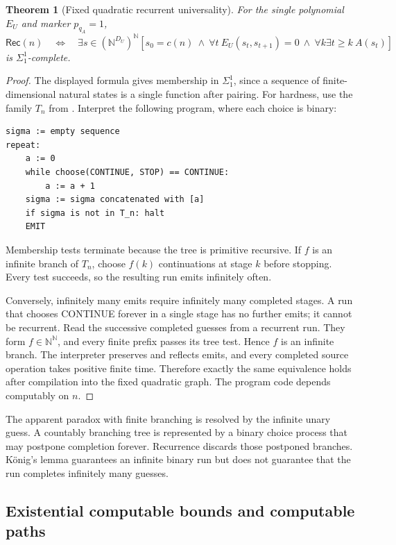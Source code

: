 \documentclass[11pt,letterpaper]{article}
\newtheorem{theorem}{Theorem}[section]
\theoremstyle{definition}
\theoremstyle{remark}
\newcommand{\N}{\mathbb N}
\newcommand{\REC}{\mathsf{Rec}}
\newcommand{\1}{\mathbf 1}
\newcommand{\srctag}[1]{\texorpdfstring{\hspace{0.4em}{\normalfont\small\color{accent}[source #1]}}{ [source #1]}}
\begin{document}
\begin{theorem}[Fixed quadratic recurrent universality]\label{lbh:qd:thm:analytic}
For the single polynomial $E_U$ and marker $p_{q_A}=1$,
\[
 \REC(n)\quad\Longleftrightarrow\quad
 \exists s\in(\N^{D_U})^\N\left[
 s_0=c(n)\ \land\ \forall t\ E_U(s_t,s_{t+1})=0
 \ \land\ \forall k\exists t\geq k\ A(s_t)\right]
\]
is $\Sigma^1_1$-complete.
\end{theorem}

\begin{proof}
The displayed formula gives membership in $\Sigma^1_1$, since a sequence of
finite-dimensional natural states is a single function after pairing.
For hardness, use the family $T_n$ from . Interpret the
following program, where each choice is binary:
\begin{lstlisting}
sigma := empty sequence
repeat:
    a := 0
    while choose(CONTINUE, STOP) == CONTINUE:
        a := a + 1
    sigma := sigma concatenated with [a]
    if sigma is not in T_n: halt
    EMIT
\end{lstlisting}
Membership tests terminate because the tree is primitive recursive. If
$f$ is an infinite branch of $T_n$, choose $f(k)$ continuations at stage
$k$ before stopping. Every test succeeds, so the resulting run emits
infinitely often.

Conversely, infinitely many emits require infinitely many completed stages.
A run that chooses CONTINUE forever in a single stage has no further emits;
it cannot be recurrent. Read the successive completed guesses from a
recurrent run. They form $f\in\N^\N$, and every finite prefix passes its
tree test. Hence $f$ is an infinite branch. The interpreter preserves and
reflects emits, and every completed source operation takes positive finite
time. Therefore exactly the same equivalence holds after compilation into
the fixed quadratic graph. The program code depends computably on $n$.
\end{proof}

The apparent paradox with finite branching is resolved by the infinite unary
guess. A countably branching tree is represented by a binary choice process
that may postpone completion forever. Recurrence discards those postponed
branches. K\"onig's lemma guarantees an infinite binary run but does not
guarantee that the run completes infinitely many guesses.
\subsection{Existential computable bounds and computable paths\srctag{03}}\label{lbh:qd:sec:sigma3}
\end{document}
